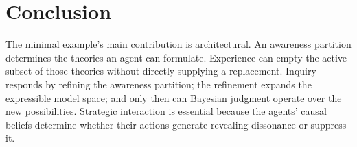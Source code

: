 \documentclass[11pt]{article}
\begin{document}
\section{Conclusion}

The minimal example's main contribution is architectural.  An awareness partition determines the theories an agent can formulate.  Experience can empty the active subset of those theories without directly supplying a replacement.  Inquiry responds by refining the awareness partition; the refinement expands the expressible model space; and only then can Bayesian judgment operate over the new possibilities.  Strategic interaction is essential because the agents' causal beliefs determine whether their actions generate revealing dissonance or suppress it.
\end{document}
